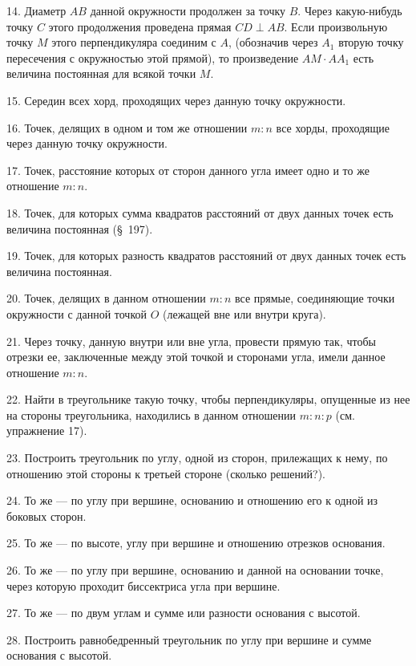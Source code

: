 \documentclass[oneside]{book}
\begin{document}
14.
Диаметр $AB$ данной окружности продолжен за точку $B$.
Через какую-нибудь точку $C$ этого продолжения проведена прямая $CD\perp AB$.
Если произвольную точку $M$ этого перпендикуляра соединим с $A$, (обозначив через $A_1$ вторую точку пересечения с окружностью этой прямой), то произведение $AM\cdot  AA_1$ есть величина постоянная для всякой точки $M$.


15.
Середин всех хорд, проходящих через данную точку окружности.

16.
Точек, делящих в одном и том же отношении $m:n$ все хорды, проходящие через данную точку окружности.

17.
Точек, расстояние которых от сторон данного угла имеет одно и то же отношение $m:n$.

18.
Точек, для которых сумма квадратов расстояний от двух данных точек есть величина постоянная (§~197).

19.
Точек, для которых разность квадратов расстояний от двух данных точек есть величина постоянная.

20.
Точек, делящих в данном отношении $m:n$ все прямые, соединяющие точки окружности с данной точкой $O$ (лежащей вне или внутри круга).


21.
Через точку, данную внутри или вне угла, провести прямую так, чтобы отрезки ее, заключенные между этой точкой и сторонами угла, имели данное отношение $m:n$.

22.
Найти в треугольнике такую точку, чтобы перпендикуляры, опущенные из нее на стороны треугольника, находились в данном отношении $m:n:p$ (см. упражнение 17).

23.
Построить треугольник по углу, одной из сторон, прилежащих к нему, по отношению этой стороны к третьей стороне (сколько решений?).

24.
То же — по углу при вершине, основанию и отношению его к одной из боковых сторон.

25.
То же — по высоте, углу при вершине и отношению отрезков основания.

26.
То же — по углу при вершине, основанию и данной на основании точке, через которую проходит биссектриса угла при вершине.

27.
То же — по двум углам и сумме или разности основания с высотой.

28.
Построить равнобедренный треугольник по углу при вершине и сумме основания с высотой.
\end{document}
